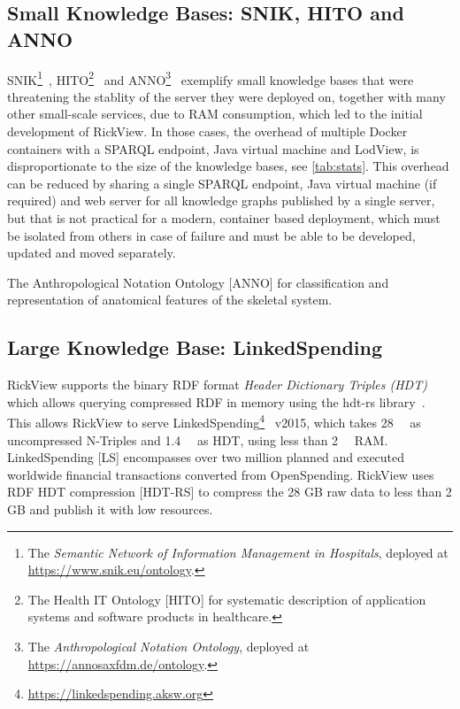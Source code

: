 \documentclass{ceurart}
\begin{document}
\subsection{Small Knowledge Bases: SNIK, HITO and ANNO}
SNIK\footnote{The \emph{Semantic Network of Information Management in Hospitals}, deployed at \url{https://www.snik.eu/ontology}.}~\citep{snik},
HITO\footnote{The Health IT Ontology [HITO] for systematic description of application systems and software products in healthcare.}~\citep{hito}
and ANNO\footnote{The \emph{Anthropological Notation Ontology}, deployed at \url{https://annosaxfdm.de/ontology}.}~\citep{anno}
exemplify small knowledge bases that were threatening the stablity of the server they were deployed on, together with many other small-scale services, due to RAM consumption, which led to the initial development of RickView.
In those cases, the overhead of multiple Docker containers with a SPARQL endpoint, Java virtual machine and LodView, is disproportionate to the size of the knowledge bases, see \cref{tab:stats}.
This overhead can be reduced by sharing a single SPARQL endpoint, Java virtual machine (if required) and web server for all knowledge graphs published by a single server, but that is not practical for a modern, container based deployment,
which must be isolated from others in case of failure and must be able to be developed, updated and moved separately.

The Anthropological Notation Ontology [ANNO] for classification and representation of anatomical features of the skeletal system.

\subsection{Large Knowledge Base: LinkedSpending}
RickView supports the binary RDF format \emph{Header Dictionary Triples (HDT)}~\citep{hdt2012} which allows querying compressed RDF in memory using the hdt-rs library~\citep{hdtrs}.
This allows RickView to serve LinkedSpending\footnote{\url{https://linkedspending.aksw.org}}~\citep{linkedspending} v2015, which takes \SI{28}{\giga\byte} as uncompressed N-Triples and \SI{1.4}{\giga\byte} as HDT, using less than \SI{2}{\giga\byte} RAM.
LinkedSpending [LS] encompasses over two million planned and executed worldwide financial transactions converted from OpenSpending. RickView uses RDF HDT compression [HDT-RS] to compress the 28 GB raw data to less than 2 GB and publish it with low resources.
\end{document}
